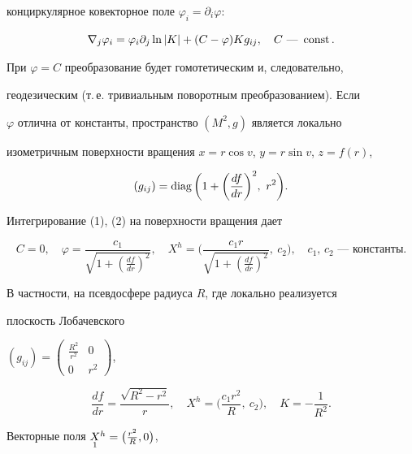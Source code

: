 конциркулярное ковекторное поле $\varphi_i=\partial_i\varphi$:


\begin{equation} 


\nabla_j\varphi_i=\varphi_i\partial_j\ln|K|+(C-\varphi)K g_{ij},\quad 


C\text{ --- }\const. 


\end{equation} 


При $\varphi=C$ преобразование будет гомотетическим и, следовательно, 


геодезическим (т.\,е. тривиальным поворотным преобразованием). Если


$\varphi$ отлична от константы, пространство $(M^2,g)$ является локально 


изометричным поверхности вращения $x=r\cos v$, $y=r\sin v$, $z=f(r)$, 


$$ 


(g_{ij})=\diag\bigg(1+\bigg(\frac{df}{dr} \bigg)^2,\ r^2 \bigg). 


$$ 


Интегрирование (1), (2) на поверхности вращения дает 


$$ 


C=0,\quad \varphi=\frac{c_1} 


{\sqrt{1+\left(\frac{df}{dr}\right)^2}},\quad 


X^h=\bigg(\frac{c_1r}{\sqrt{1+\left(\frac{df}{dr}\right)^2}}, 


\ c_2\bigg),\quad c_1,\,c_2\text{ --- константы}. 


$$ 


В частности, на псевдосфере радиуса $R$, где локально реализуется 


плоскость Лобачевского 


$(g_{ij})=\begin{pmatrix} 


\frac{R^2}{r^2} & 0 \\ 0 & r^2 


\end{pmatrix}$, 


$$ 


\frac{df}{dr}=\frac{\sqrt{R^2-r^2}}{r},\quad 


X^h=\bigg(\frac{c_1r^2}{R},\ c_2 \bigg),\quad 


K=-\frac{1}{R^2}. 


$$ 


Векторные поля $\underset{1}{X}{}^h=\big(\frac{r^2}{R},0\big)$, 



